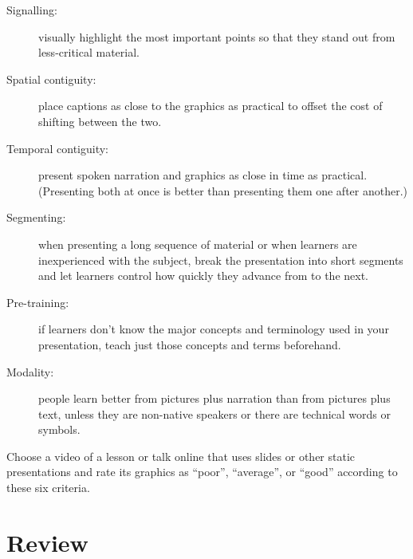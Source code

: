 \begin{description}

\item[Signalling:]
  visually highlight the most important points
  so that they stand out from less-critical material.

\item[Spatial contiguity:]
  place captions as close to the graphics as practical to offset the cost of shifting between the two.

\item[Temporal contiguity:]
  present spoken narration and graphics as close in time as practical.
  (Presenting both at once is better than presenting them one after another.)

\item[Segmenting:]
  when presenting a long sequence of material or when learners are inexperienced with the subject,
  break the presentation into short segments
  and let learners control how quickly they advance from to the next.

\item[Pre-training:]
  if learners don't know the major concepts and terminology used in your presentation,
  teach just those concepts and terms beforehand.

\item[Modality:]
  people learn better from pictures plus narration than from pictures plus text,
  unless they are non-native speakers
  or there are technical words or symbols.

\end{description}

Choose a video of a lesson or talk online that uses slides or other static presentations
and rate its graphics as ``poor'', ``average'', or ``good'' according to these six criteria.

\section*{Review}

